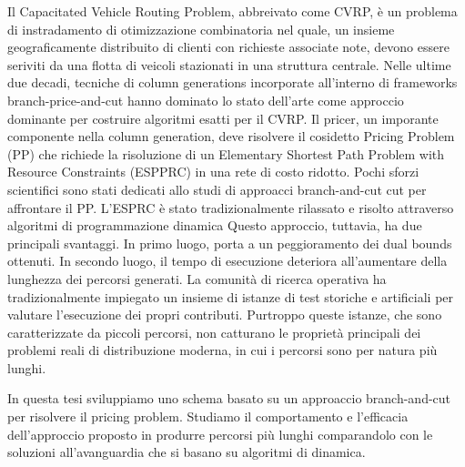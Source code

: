 \noindent Il Capacitated Vehicle Routing Problem, abbreivato come CVRP,
è un problema di instradamento di otimizzazione combinatoria  nel quale,
un insieme geograficamente distribuito di clienti con richieste associate note,
devono essere seriviti da una flotta di veicoli stazionati in una struttura centrale.
Nelle ultime due decadi,
tecniche di column generations incorporate all'interno di frameworks branch-price-and-cut
hanno dominato lo stato dell'arte come approccio dominante
per costruire algoritmi esatti per il CVRP.
Il pricer, un imporante componente nella column generation, deve risolvere
il cosidetto Pricing Problem (PP) che richiede la risoluzione di un
Elementary Shortest Path Problem with Resource Constraints (ESPPRC)
in una rete di costo ridotto.
Pochi sforzi scientifici sono stati dedicati allo studi di approacci
branch-and-cut cut per affrontare il PP.
L'ESPRC è stato tradizionalmente rilassato e risolto attraverso algoritmi di programmazione dinamica
Questo approccio, tuttavia, ha due principali svantaggi.
In primo luogo, porta a un peggioramento dei dual bounds ottenuti.
In secondo luogo, il tempo di esecuzione deteriora all'aumentare della lunghezza dei percorsi generati.
La comunità di ricerca operativa ha tradizionalmente impiegato
un insieme di istanze di test storiche e artificiali per valutare
l'esecuzione dei propri contributi.
Purtroppo queste istanze, che sono caratterizzate da piccoli percorsi,
non catturano le proprietà principali dei problemi reali di distribuzione moderna,
in cui i percorsi sono per natura più lunghi.

\noindent In questa tesi sviluppiamo
uno schema basato su un approaccio branch-and-cut per risolvere il pricing problem.
Studiamo il comportamento e l'efficacia dell'approccio proposto in produrre percorsi più lunghi
comparandolo con le soluzioni all'avanguardia che si basano su algoritmi di dinamica.
